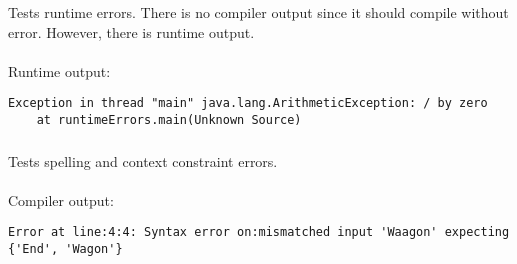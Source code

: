 \subsubsection*{}
Tests runtime errors. There is no compiler output since it should compile without error. However, there is runtime output. \\
\\
Runtime output:
\begin{lstlisting}
Exception in thread "main" java.lang.ArithmeticException: / by zero
	at runtimeErrors.main(Unknown Source)
\end{lstlisting}

\subsubsection*{}
Tests spelling and context constraint errors. \\
\\
Compiler output:
\begin{lstlisting}
Error at line:4:4: Syntax error on:mismatched input 'Waagon' expecting {'End', 'Wagon'}
\end{lstlisting}
